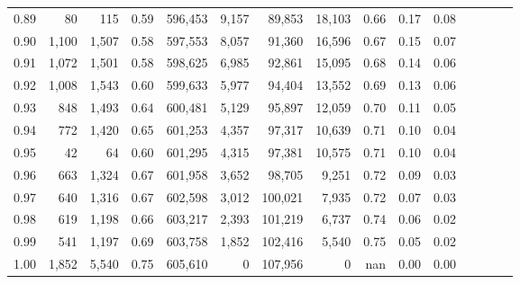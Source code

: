 \begin{tabular}{rrrcrrrrrrrrrrr}
0.89 &      80 &    115 &                                       0.59 &  596,453 &    9,157 &   89,853 &   18,103 &  0.66 &  0.17 &                         0.08 \\
0.90 &   1,100 &  1,507 &                                       0.58 &  597,553 &    8,057 &   91,360 &   16,596 &  0.67 &  0.15 &                         0.07 \\
0.91 &   1,072 &  1,501 &                                       0.58 &  598,625 &    6,985 &   92,861 &   15,095 &  0.68 &  0.14 &                         0.06 \\
0.92 &   1,008 &  1,543 &                                       0.60 &  599,633 &    5,977 &   94,404 &   13,552 &  0.69 &  0.13 &                         0.06 \\
0.93 &     848 &  1,493 &                                       0.64 &  600,481 &    5,129 &   95,897 &   12,059 &  0.70 &  0.11 &                         0.05 \\
0.94 &     772 &  1,420 &                                       0.65 &  601,253 &    4,357 &   97,317 &   10,639 &  0.71 &  0.10 &                         0.04 \\
0.95 &      42 &     64 &                                       0.60 &  601,295 &    4,315 &   97,381 &   10,575 &  0.71 &  0.10 &                         0.04 \\
0.96 &     663 &  1,324 &                                       0.67 &  601,958 &    3,652 &   98,705 &    9,251 &  0.72 &  0.09 &                         0.03 \\
0.97 &     640 &  1,316 &                                       0.67 &  602,598 &    3,012 &  100,021 &    7,935 &  0.72 &  0.07 &                         0.03 \\
0.98 &     619 &  1,198 &                                       0.66 &  603,217 &    2,393 &  101,219 &    6,737 &  0.74 &  0.06 &                         0.02 \\
0.99 &     541 &  1,197 &                                       0.69 &  603,758 &    1,852 &  102,416 &    5,540 &  0.75 &  0.05 &                         0.02 \\
1.00 &   1,852 &  5,540 &                                       0.75 &  605,610 &        0 &  107,956 &        0 &   nan &  0.00 &                         0.00 \\
\bottomrule
\end{tabular}
